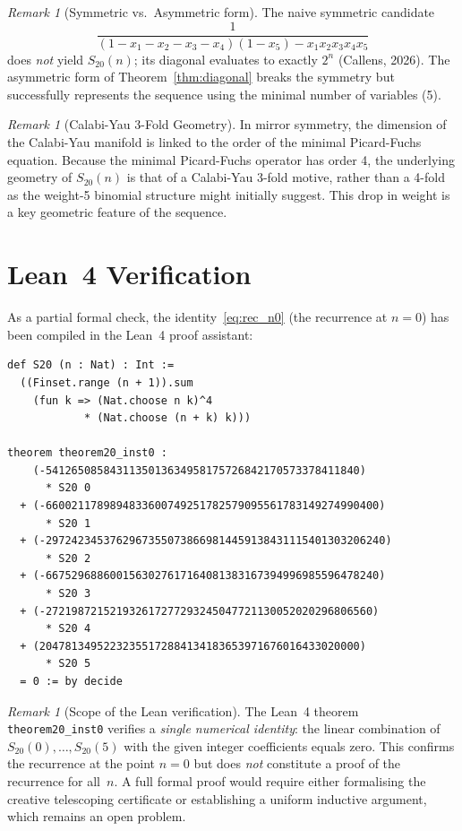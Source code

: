 \documentclass[12pt,reqno]{amsart}
\theoremstyle{plain}
\theoremstyle{definition}
\theoremstyle{remark}
\newtheorem{remark}[theorem]{Remark}
\begin{document}
\begin{remark}[Symmetric vs.\ Asymmetric form]\label{rem:diag_comparison}
The naive symmetric candidate
\[
\frac{1}{(1 - x_1 - x_2 - x_3 - x_4)(1 - x_5) - x_1 x_2 x_3 x_4 x_5}
\]
does \emph{not} yield $S_{20}(n)$; its diagonal evaluates to exactly $2^n$ (Callens, 2026). The asymmetric form of Theorem~\ref{thm:diagonal} breaks the symmetry but successfully represents the sequence using the minimal number of variables (5).
\end{remark}

\begin{remark}[Calabi-Yau 3-Fold Geometry]\label{rem:cy3fold}
In mirror symmetry, the dimension of the Calabi-Yau manifold is linked to the order of the minimal Picard-Fuchs equation. Because the minimal Picard-Fuchs operator has order 4, the underlying geometry of $S_{20}(n)$ is that of a Calabi-Yau 3-fold motive, rather than a 4-fold as the weight-5 binomial structure might initially suggest. This drop in weight is a key geometric feature of the sequence.
\end{remark}


\section{Lean~4 Verification}\label{sec:lean}

As a partial formal check, the identity~\eqref{eq:rec_n0}
(the recurrence at $n = 0$) has been compiled in the Lean~4
proof assistant:

\begin{verbatim}
def S20 (n : Nat) : Int :=
  ((Finset.range (n + 1)).sum
    (fun k => (Nat.choose n k)^4
            * (Nat.choose (n + k) k)))

theorem theorem20_inst0 :
    (-5412650858431135013634958175726842170573378411840)
      * S20 0
  + (-6600211789894833600749251782579095561783149274990400)
      * S20 1
  + (-29724234537629673550738669814459138431115401303206240)
      * S20 2
  + (-6675296886001563027617164081383167394996985596478240)
      * S20 3
  + (-272198721521932617277293245047721130052020296806560)
      * S20 4
  + (20478134952232355172884134183653971676016433020000)
      * S20 5
  = 0 := by decide
\end{verbatim}

\begin{remark}[Scope of the Lean verification]\label{rem:lean_scope}
The Lean~4 theorem \texttt{theorem20\_inst0} verifies a
\emph{single numerical identity}: the linear combination of
$S_{20}(0), \ldots, S_{20}(5)$ with the given integer
coefficients equals zero.
This confirms the recurrence at the point $n = 0$ but does
\emph{not} constitute a proof of the recurrence for all~$n$.
A full formal proof would require either formalising the
creative telescoping certificate or establishing a uniform
inductive argument, which remains an open problem.
\end{remark}
\end{document}
